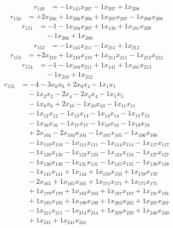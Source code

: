 \[\begin{aligned}
r_{149} &= - 1 x_{145} x_{207} - 1 x_{207} + 1 x_{208}
\end{aligned}\]
\[\begin{aligned}
r_{150} &= + 2 x_{206} + 1 x_{206} x_{206} + 1 x_{207} x_{207} - 1 x_{208} x_{208}
\end{aligned}\]
\[\begin{aligned}
r_{151} &= - 1 - 1 x_{104} x_{207} + 1 x_{138} + 1 x_{161} x_{209} \\
 &\quad - 1 x_{206} + 1 x_{208}
\end{aligned}\]
\[\begin{aligned}
r_{152} &= - 1 x_{145} x_{211} - 1 x_{211} + 1 x_{212}
\end{aligned}\]
\[\begin{aligned}
r_{153} &= + 2 x_{210} + 1 x_{210} x_{210} + 1 x_{211} x_{211} - 1 x_{212} x_{212}
\end{aligned}\]
\[\begin{aligned}
r_{154} &= - 1 - 1 x_{104} x_{211} + 1 x_{141} + 1 x_{161} x_{213} \\
 &\quad - 1 x_{210} + 1 x_{212}
\end{aligned}\]
\[\begin{aligned}
r_{155} &= - 4 - 3 x_{0} x_{0} + 2 x_{0} x_{4} - 1 x_{1} x_{1} \\
 &\quad - 1 x_{2} x_{2} - 2 x_{4} - 2 x_{4} x_{4} - 1 x_{5} x_{5} \\
 &\quad - 1 x_{6} x_{6} + 2 x_{10} - 1 x_{10} x_{10} - 1 x_{11} x_{11} \\
 &\quad - 1 x_{12} x_{12} - 1 x_{13} x_{13} - 1 x_{14} x_{14} - 1 x_{15} x_{15} \\
 &\quad - 1 x_{16} x_{16} - 1 x_{17} x_{17} - 1 x_{18} x_{18} - 1 x_{19} x_{19} \\
 &\quad + 2 x_{104} - 2 x_{104} x_{104} - 1 x_{105} x_{105} - 1 x_{106} x_{106} \\
 &\quad - 1 x_{110} x_{110} - 1 x_{111} x_{111} - 1 x_{114} x_{114} - 1 x_{117} x_{117} \\
 &\quad - 1 x_{120} x_{120} - 1 x_{123} x_{123} - 1 x_{124} x_{124} - 1 x_{127} x_{127} \\
 &\quad - 1 x_{130} x_{130} - 1 x_{131} x_{131} - 1 x_{135} x_{135} - 1 x_{138} x_{138} \\
 &\quad - 1 x_{141} x_{141} + 1 x_{144} + 1 x_{150} x_{150} + 1 x_{159} x_{159} \\
 &\quad - 2 x_{165} + 1 x_{165} x_{165} + 1 x_{171} x_{171} + 1 x_{175} x_{175} \\
 &\quad + 1 x_{179} x_{179} + 1 x_{183} x_{183} + 1 x_{187} x_{187} + 1 x_{191} x_{191} \\
 &\quad + 1 x_{195} x_{195} + 1 x_{199} x_{199} + 1 x_{203} x_{203} + 1 x_{207} x_{207} \\
 &\quad - 1 x_{211} x_{211} - 1 x_{214} x_{214} + 1 x_{239} x_{239} + 1 x_{240} x_{240} \\
 &\quad + 1 x_{241} + 1 x_{241} x_{241}
\end{aligned}\]
